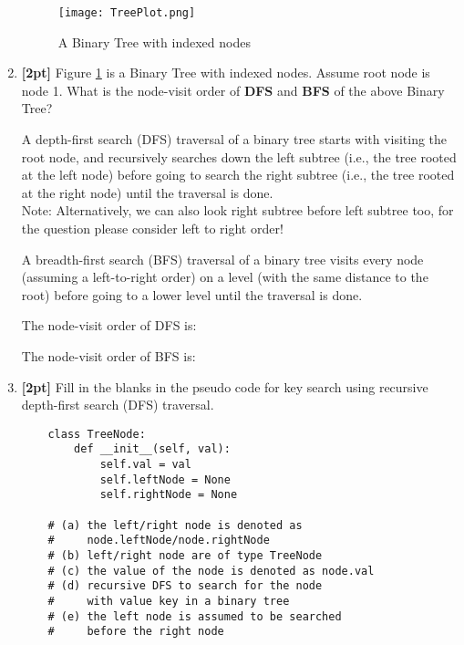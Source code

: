\documentclass[12pt]{article}
\begin{document}
\begin{enumerate}
    
    \begin{figure}[H]
        \centering
        \texttt{[image: TreePlot.png]}
        \caption{A Binary Tree with indexed nodes}
        \label{tree}
    \end{figure}
    \item \textbf{[2pt]} Figure \ref{tree} is a Binary Tree with indexed nodes. Assume root node is node 1. What is the node-visit order of \textbf{DFS} and \textbf{BFS} of the above Binary Tree? 
    
    A depth-first search (DFS) traversal of a binary tree starts with visiting the root node, and recursively searches down the left subtree (i.e., the tree rooted at the left node) before going to search the right subtree (i.e., the tree rooted at the right node) until the traversal is done.\\
    Note: Alternatively, we can also look right subtree before left subtree too, for the question please consider left to right order!
    
    A breadth-first search (BFS) traversal of a binary tree visits every node (assuming a left-to-right order) on a level (with the same distance to the root) before going to a lower level until the traversal is done.
    
    The node-visit order of DFS is:
    
    \begin{tcolorbox}[fit,height=1cm, width=\textwidth, blank, borderline={1pt}{-2pt},nobeforeafter]
    \end{tcolorbox}
    
    The node-visit order of BFS is:
    
    \begin{tcolorbox}[fit,height=1cm, width=\textwidth, blank, borderline={1pt}{-2pt},nobeforeafter]
    \end{tcolorbox}
    
    
    \clearpage

    \item \textbf{[2pt]} Fill in the blanks in the pseudo code for key search using recursive depth-first search (DFS) traversal.
    
    \begin{lstlisting}
    class TreeNode:
        def __init__(self, val):
            self.val = val
            self.leftNode = None
            self.rightNode = None
        
    # (a) the left/right node is denoted as
    #     node.leftNode/node.rightNode
    # (b) left/right node are of type TreeNode
    # (c) the value of the node is denoted as node.val
    # (d) recursive DFS to search for the node 
    #     with value key in a binary tree
    # (e) the left node is assumed to be searched 
    #     before the right node
        

\end{lstlisting}
\end{enumerate}
\end{document}
